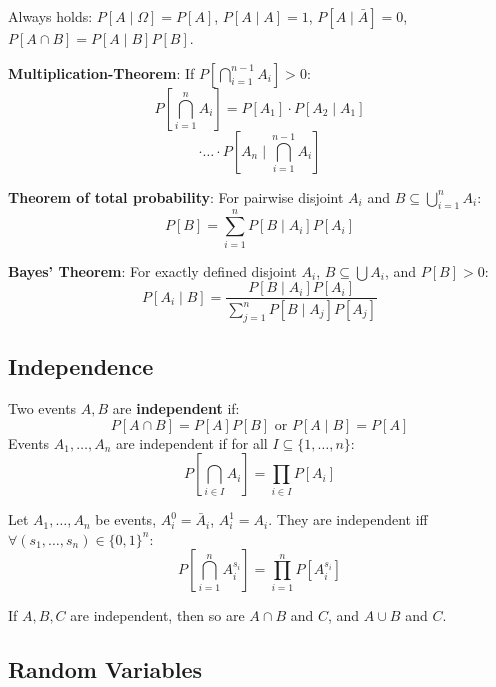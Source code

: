 \begin{remark}
Always holds: $P[A \mid \Omega] = P[A]$, $P[A \mid A] = 1$, $P[A \mid \bar{A}] = 0$, $P[A \cap B] = P[A \mid B] P[B]$.
\end{remark}

\begin{theorem}
\textbf{Multiplication-Theorem}: If $P[\bigcap_{i=1}^{n-1} A_i] > 0$:
$$P[\bigcap_{i=1}^n A_i] = P[A_1] \cdot P[A_2 \mid A_1]$$
$$\cdot \dots \cdot P[A_n \mid \bigcap_{i=1}^{n-1} A_i]$$
\end{theorem}

\begin{theorem}
\textbf{Theorem of total probability}: For pairwise disjoint $A_i$ and $B \subseteq \bigcup_{i=1}^n A_i$:
$$P[B] = \sum_{i=1}^n P[B \mid A_i] P[A_i]$$
\end{theorem}

\begin{theorem}
\textbf{Bayes' Theorem}: For exactly defined disjoint $A_i$, $B \subseteq \bigcup A_i$, and $P[B] > 0$:
$$P[A_i \mid B] = \frac{P[B \mid A_i] P[A_i]}{\sum_{j=1}^n P[B \mid A_j] P[A_j]}$$
\end{theorem}

\subsection{Independence}

\begin{definition}
Two events $A, B$ are \textbf{independent} if:
$$P[A \cap B] = P[A] P[B] \text{ or } P[A \mid B] = P[A]$$
Events $A_1, \dots, A_n$ are independent if for all $I \subseteq \{1, \dots, n\}$:
$$P[\bigcap_{i \in I} A_i] = \prod_{i \in I} P[A_i]$$
\end{definition}

\begin{lemma}
Let $A_1, \dots, A_n$ be events, $A_i^0 = \bar{A}_i$, $A_i^1 = A_i$. They are independent iff $\forall (s_1,\dots,s_n) \in \{0,1\}^n$:
$$P[\bigcap_{i=1}^n A_i^{s_i}] = \prod_{i=1}^n P[A_i^{s_i}]$$
\end{lemma}

\begin{lemma}
If $A, B, C$ are independent, then so are $A \cap B$ and $C$, and $A \cup B$ and $C$.
\end{lemma}

\subsection{Random Variables}

